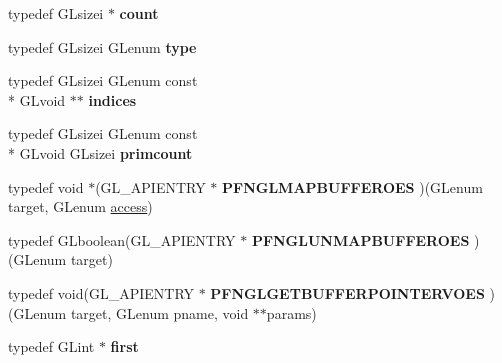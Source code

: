 \begin{DoxyCompactItemize}
\item 
\hypertarget{class_c_p_v_r_tgles2_ext_ae46ef971946caa4bbe3dc5fb5757c585}{typedef G\+Lsizei $\ast$ {\bfseries count}}\label{class_c_p_v_r_tgles2_ext_ae46ef971946caa4bbe3dc5fb5757c585}

\item 
\hypertarget{class_c_p_v_r_tgles2_ext_ae35a01467acb4ae310b2cb7e899ffd3e}{typedef G\+Lsizei G\+Lenum {\bfseries type}}\label{class_c_p_v_r_tgles2_ext_ae35a01467acb4ae310b2cb7e899ffd3e}

\item 
\hypertarget{class_c_p_v_r_tgles2_ext_af9803324346cb2059088eb1d9fb0897c}{typedef G\+Lsizei G\+Lenum const \\*
G\+Lvoid $\ast$$\ast$ {\bfseries indices}}\label{class_c_p_v_r_tgles2_ext_af9803324346cb2059088eb1d9fb0897c}

\item 
\hypertarget{class_c_p_v_r_tgles2_ext_ac3400e5ec3a7873cb13c644fe4bf1e3e}{typedef G\+Lsizei G\+Lenum const \\*
G\+Lvoid G\+Lsizei {\bfseries primcount}}\label{class_c_p_v_r_tgles2_ext_ac3400e5ec3a7873cb13c644fe4bf1e3e}

\item 
\hypertarget{class_c_p_v_r_tgles2_ext_ab804a687751784d70f1dc055c8d6fe93}{typedef void $\ast$(G\+L\+\_\+\+A\+P\+I\+E\+N\+T\+R\+Y $\ast$ {\bfseries P\+F\+N\+G\+L\+M\+A\+P\+B\+U\+F\+F\+E\+R\+O\+E\+S} )(G\+Lenum target, G\+Lenum \hyperlink{structaccess}{access})}\label{class_c_p_v_r_tgles2_ext_ab804a687751784d70f1dc055c8d6fe93}

\item 
\hypertarget{class_c_p_v_r_tgles2_ext_a24c4410b572b8c8ba94c6dbae6bcc441}{typedef G\+Lboolean(G\+L\+\_\+\+A\+P\+I\+E\+N\+T\+R\+Y $\ast$ {\bfseries P\+F\+N\+G\+L\+U\+N\+M\+A\+P\+B\+U\+F\+F\+E\+R\+O\+E\+S} )(G\+Lenum target)}\label{class_c_p_v_r_tgles2_ext_a24c4410b572b8c8ba94c6dbae6bcc441}

\item 
\hypertarget{class_c_p_v_r_tgles2_ext_a8b167795a23163686fb202116c9a944a}{typedef void(G\+L\+\_\+\+A\+P\+I\+E\+N\+T\+R\+Y $\ast$ {\bfseries P\+F\+N\+G\+L\+G\+E\+T\+B\+U\+F\+F\+E\+R\+P\+O\+I\+N\+T\+E\+R\+V\+O\+E\+S} )(G\+Lenum target, G\+Lenum pname, void $\ast$$\ast$params)}\label{class_c_p_v_r_tgles2_ext_a8b167795a23163686fb202116c9a944a}

\item 
\hypertarget{class_c_p_v_r_tgles2_ext_aa887b2d616ec8ca2ec73df3843c1ae00}{typedef G\+Lint $\ast$ {\bfseries first}}\label{class_c_p_v_r_tgles2_ext_aa887b2d616ec8ca2ec73df3843c1ae00}


\end{DoxyCompactItemize}
